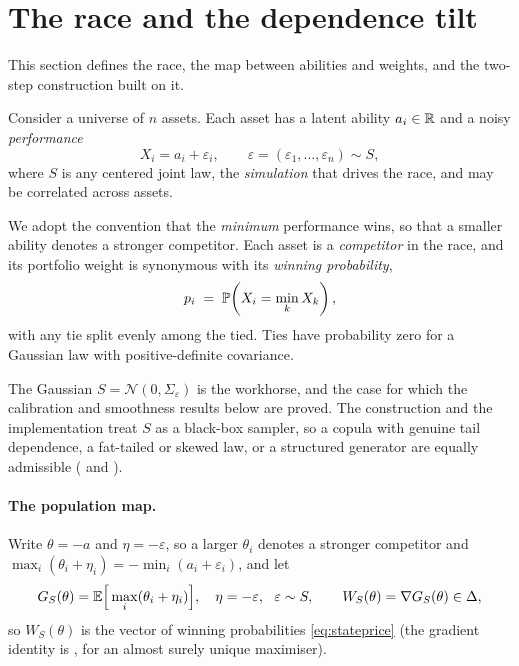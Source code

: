 \section{The race and the dependence tilt}
\label{sec:method}
\label{sec:model}

This section defines the race, the map between abilities and weights, and the
two-step construction built on it.

Consider a universe of $n$ assets.
Each asset has a latent ability $a_i\in\mathbb{R}$ and
a noisy \emph{performance}
\begin{equation}
  X_i = a_i + \varepsilon_i, \qquad \varepsilon = (\varepsilon_1,\dots,\varepsilon_n)
  \sim S,
  \label{eq:performance}
\end{equation}
where $S$ is any centered joint law, the \emph{simulation} that drives the race,
and may be correlated across assets.

We adopt the convention that the
\emph{minimum} performance wins, so that a smaller ability denotes a stronger
competitor.
Each asset is a \emph{competitor} in the race, and its portfolio weight is
synonymous with its \emph{winning probability},
\begin{equation}
  p_i \;=\; \mathbb{P}\!\left( X_i = \min_{k} X_k \right),
  \label{eq:stateprice}
\end{equation}
with any tie split evenly among the tied. Ties have probability zero for a Gaussian
law with positive-definite covariance.

The Gaussian $S = \mathcal{N}(0, \Sigma_\varepsilon)$ is the workhorse, and the
case for which the calibration and smoothness results below are proved.
The construction and the implementation treat $S$ as a black-box sampler, so a
copula with genuine tail dependence, a fat-tailed or skewed law, or a structured
generator are equally admissible ( and ).

\paragraph{The population map.}
Write $\theta = -a$ and $\eta = -\varepsilon$, so a larger $\theta_i$ denotes a
stronger competitor and $\max_i(\theta_i + \eta_i) = -\min_i(a_i + \varepsilon_i)$,
and let
\begin{equation}
  G_S(\theta) = \mathbb{E}\Big[\max_i(\theta_i + \eta_i)\Big], \quad
  \eta = -\varepsilon,\ \ \varepsilon\sim S, \qquad
  W_S(\theta) = \nabla G_S(\theta) \in \Delta,
  \label{eq:popmap}
\end{equation}
so $W_S(\theta)$ is the vector of winning probabilities \eqref{eq:stateprice} (the
gradient identity is , for an almost surely unique maximiser).


